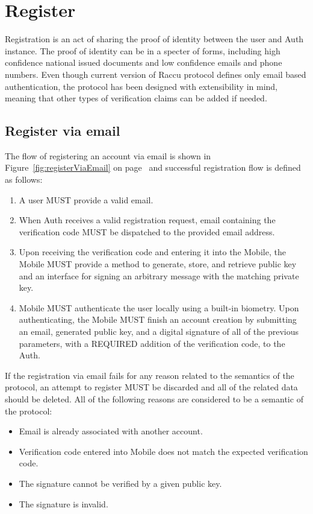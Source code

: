 \section{Register}
Registration is an act of sharing the proof of identity between the user and Auth instance. The proof of identity
can be in a specter of forms, including high confidence national issued documents and low confidence emails and 
phone numbers. Even though current version of Raccu protocol defines only email based authentication, the protocol
has been designed with extensibility in mind, meaning that other types of verification claims can be added if
needed.

      \subsection{Register via email}
      The flow of registering an account via email is shown in Figure~\ref{fig:registerViaEmail} on 
      page~\pageref{fig:registerViaEmail} and successful registration flow is defined as follows:
      \begin{enumerate}
            \item A user MUST provide a valid email.
            \item When Auth receives a valid registration request, email containing the verification code MUST 
                  be dispatched to the provided email address.
            \item Upon receiving the verification code and entering it into the Mobile, the Mobile MUST provide 
                  a method to generate, store, and retrieve public key and an interface for signing an arbitrary 
                  message with the matching private key.
            \item Mobile MUST authenticate the user locally using a built-in biometry. Upon authenticating, 
                  the Mobile MUST finish an account creation by submitting an email, generated public key, 
                  and a digital signature of all of the previous parameters, with a REQUIRED addition of the 
                  verification code, to the Auth.
      \end{enumerate}
             
      If the registration via email fails for any reason related to the semantics of the protocol, an attempt to
      register MUST be discarded and all of the related data should be deleted. All of the following reasons are 
      considered to be a semantic of the protocol:
      \begin{itemize}
            \item Email is already associated with another account.
            \item Verification code entered into Mobile does not match the expected verification code.
            \item The signature cannot be verified by a given public key.
            \item The signature is invalid.
      \end{itemize}
